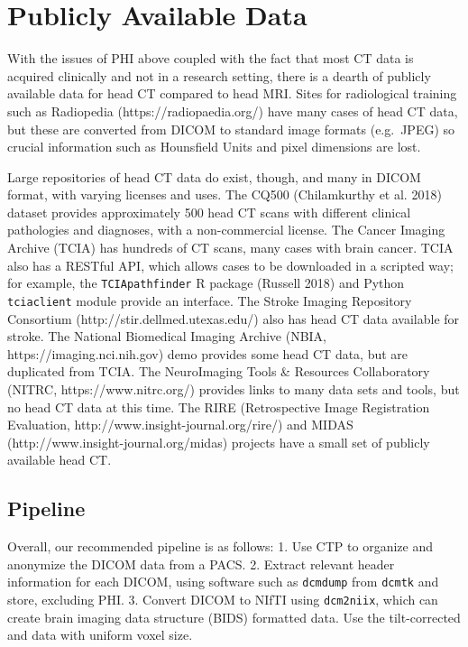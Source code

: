 \documentclass[]{elsarticle} %
\begin{document}
\hypertarget{publicly-available-data}{%
\section{Publicly Available Data}\label{publicly-available-data}}

With the issues of PHI above coupled with the fact that most CT data is
acquired clinically and not in a research setting, there is a dearth of
publicly available data for head CT compared to head MRI. Sites for
radiological training such as Radiopedia (https://radiopaedia.org/) have
many cases of head CT data, but these are converted from DICOM to
standard image formats (e.g.~JPEG) so crucial information such as
Hounsfield Units and pixel dimensions are lost.

Large repositories of head CT data do exist, though, and many in DICOM
format, with varying licenses and uses. The CQ500 (Chilamkurthy et al.
2018) dataset provides approximately 500 head CT scans with different
clinical pathologies and diagnoses, with a non-commercial license. The
Cancer Imaging Archive (TCIA) has hundreds of CT scans, many cases with
brain cancer. TCIA also has a RESTful API, which allows cases to be
downloaded in a scripted way; for example, the \texttt{TCIApathfinder} R
package (Russell 2018) and Python \texttt{tciaclient} module provide an
interface. The Stroke Imaging Repository Consortium
(http://stir.dellmed.utexas.edu/) also has head CT data available for
stroke. The National Biomedical Imaging Archive (NBIA,
https://imaging.nci.nih.gov) demo provides some head CT data, but are
duplicated from TCIA. The NeuroImaging Tools \& Resources Collaboratory
(NITRC, https://www.nitrc.org/) provides links to many data sets and
tools, but no head CT data at this time. The RIRE (Retrospective Image
Registration Evaluation, http://www.insight-journal.org/rire/) and MIDAS
(http://www.insight-journal.org/midas) projects have a small set of
publicly available head CT.

\hypertarget{pipeline}{%
\subsection{Pipeline}\label{pipeline}}

Overall, our recommended pipeline is as follows: 1. Use CTP to organize
and anonymize the DICOM data from a PACS. 2. Extract relevant header
information for each DICOM, using software such as \texttt{dcmdump} from
\texttt{dcmtk} and store, excluding PHI. 3. Convert DICOM to NIfTI using
\texttt{dcm2niix}, which can create brain imaging data structure (BIDS)
formatted data. Use the tilt-corrected and data with uniform voxel size.
\end{document}
